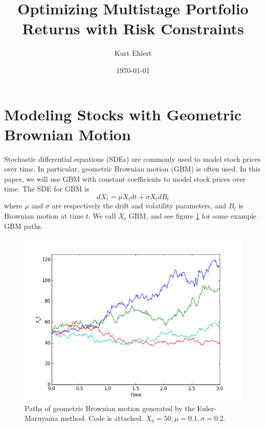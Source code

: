 \documentclass{amsart}
\title{Optimizing Multistage Portfolio Returns with Risk Constraints}
\author{Kurt Ehlert}
\date{\today}
\theoremstyle{definition}
\theoremstyle{remark}
\begin{document}
\maketitle

\tableofcontents

\section{Modeling Stocks with Geometric Brownian Motion}
Stochastic differential equations (SDEs) are commonly used to model stock prices over time. In particular,
geometric Brownian motion (GBM) is often used.\cite{hull} In this paper, we will use GBM with constant coefficients to model stock prices over time. The SDE for GBM is
\begin{equation}\label{eq:GBM_SDE}
dX_t = \mu X_t dt + \sigma X_t dB_t
\end{equation}
where $\mu$ and $\sigma$ are respectively the drift and volatility parameters, and $B_t$ is Brownian motion at time $t$. We call $X_t$ GBM, and see figure \ref{fig:mesh1} for some example GBM paths.

\begin{figure}
\centering
\includegraphics[scale=0.5]{geometric_bm.png}
\caption{Paths of geometric Brownian motion generated by the Euler-Maruyama method. Code is attached. $X_0 = 50, \mu=0.1, \sigma=0.2$.}
\label{fig:mesh1}
\end{figure}
\end{document}
